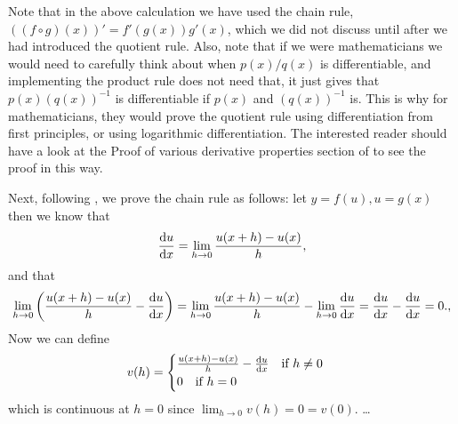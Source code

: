 \begin{mdiv}
Note that in the above calculation we have used the chain rule, $\left((f\circ g)(x)\right)'=f'(g(x))g'(x)$, which we did not discuss until after we had introduced the quotient rule.  Also, note that if we were mathematicians we would need to carefully think about when $p(x)/q(x)$ is differentiable, and implementing the product rule does not need that, it just gives that $p(x)(q(x))^{-1}$ is differentiable if $p(x)$ and $(q(x))^{-1}$ is.  This is why for mathematicians, they would prove the quotient rule using differentiation from first principles, or using logarithmic differentiation. The interested reader should have a look at the Proof of various derivative properties section of \citep{calcI} to see the proof in this way.
\end{mdiv}

Next, following \citep{calcI}, we prove the chain rule as follows: let $y=f(u), u=g(x)$ then we know that
\begin{equation*}
\frac{\mathrm{d} u}{\mathrm{d} x}=\lim_{h\to 0}\frac{u(x+h)-u(x)}{h},
\end{equation*}
and that 
\begin{equation*}
\lim_{h\to 0}\left(\frac{u(x+h)-u(x)}{h}-\frac{\mathrm{d} u}{\mathrm{d} x}\right)=\lim_{h\to 0}\frac{u(x+h)-u(x)}{h}-\lim_{h\to 0}\frac{\mathrm{d} u}{\mathrm{d} x}=\frac{\mathrm{d} u}{\mathrm{d} x}-\frac{\mathrm{d} u}{\mathrm{d} x}=0.,
\end{equation*}
Now we can define
\begin{equation*}
v(h)=\begin{cases}
\frac{u(x+h)-u(x)}{h}-\frac{\mathrm{d} u}{\mathrm{d} x} \quad \text{if } h\neq 0\\
0 \quad \text{if } h=0
\end{cases}
\end{equation*}
which is continuous at $h=0$ since $\lim_{h\to 0}v(h)=0=v(0)$. \dots{}
